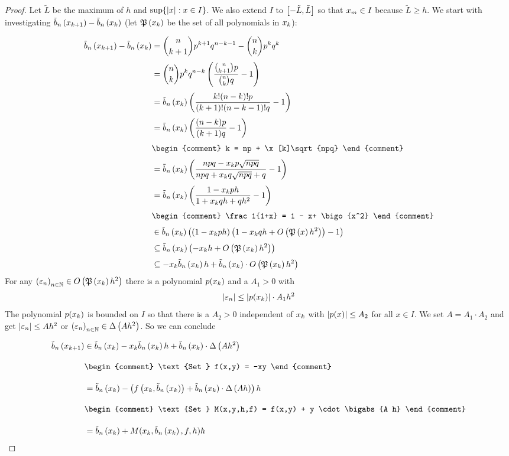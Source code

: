 \begin{proof}
  \newcommand*{\Lt}{\tilde L}

  Let $\Lt$ be the maximum of $h$ and $\sup\{\abs{x}: x \in I\}$. We also extend $I$ to $\interval{-\Lt}{\Lt}$ so that $\xnp \in I$ because $\Lt \ge h$. We start with investigating $\bb{\x[k+1]}-\bb{\x[k]}$ (let $\pol{\x}$ be the set of all polynomials in $\x$):

  \begin{align}
    \bb{\x[k+1]} - \bb{\x[k]} &= \binom n{k+1} p^{k+1}q^{n-k-1} - \binom nk p^k q^k \nl
    &= \binom nk p^k q^{n-k} \br{\frac{\binom n{k+1}p}{\binom nk q} -1} \nl
    &= \bb{\x[k]} \br{\frac{k! (n-k)! p}{(k+1)!(n-k-1)! q} -1} \nl
    &= \bb{\x[k]} \br{\frac{(n-k)p}{(k+1)q}-1} \nl
    &
    \begin{comment}
      k = np + \x[k]\sqrt{npq}
    \end{comment} \nl
    &= \bb{\x[k]} \br{\frac{npq-\x[k]p\sqrt{npq}}{npq + \x[k]q\sqrt{npq}+q}-1} \nl
    &= \bb{\x[k]} \br{\frac{1-\x[k]ph}{1+\x[k]qh+qh^2}-1} \nl
    &
    \begin{comment}
      \frac1{1+x} = 1 - x+ \bigo{x^2}
    \end{comment} \nl
    &\in \bb{\x[k]} \br{\br{1-\x[k]ph}\br{1-\x[k]qh + \bigo{\pol{x}h^2}}-1} \nl
    &\subseteq \bb{\x[k]} \br{-\x[k]h + \bigo{\pol{\x}h^2}} \nl
    &\subseteq -\x[k]\bb{\x}h +  \bb{\x[k]} \cdot \bigo{\pol{\x}h^2}
  \end{align}
  For any $\seq{\epsilon_n} \in \bigo{\pol{\x[k]}h^2}$ there is a polynomial $p(\x[k])$ and a $A_1 > 0$ with
  \begin{align}
    \abs{\epsilon_n} \le \abs{p(\x[k])} \cdot A_1 h^2
  \end{align}
  The polynomial $p(\x)$ is bounded on $I$ so that there is a $A_2>0$ independent of $\x$ with $\abs{p(x)} \le A_2$ for all $x\in I$. We set $A=A_1\cdot A_2$ and get $\abs{\epsilon_n} \le A h^2$ or $\seq{\epsilon_n}\in \bigabs{A h^2}$. So we can conclude

  \begin{align}
    \bb{\x[k+1]} &\in \bb{\x[k]} -\x[k]\bb{\x[k]} h + \bb{\x} \cdot \bigabs{A h^2}\bnl
    &
    \begin{comment}
      \text{Set } f(x,y) = -xy
    \end{comment} \bnl
    &= \bb{\x[k]} - \br{\f{\x[k], \bb{\x[k]}} + \bb{\x} \cdot \bigabs{A h}}h \bnl
    &
    \begin{comment}
      \text{Set } M(x,y,h,f) = f(x,y) + y \cdot \bigabs{A h}
    \end{comment} \bnl
    &= \bb{\x[k]} + M(\x[k], \bb{\x[k]}, f, h) h
  \end{align}


\end{proof}
